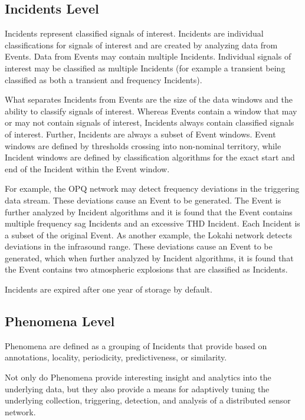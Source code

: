 \subsection{Incidents Level}\label{subsec:incidents-level}
Incidents represent classified signals of interest. Incidents are individual classifications for signals of interest and are created by analyzing data from Events. Data from Events may contain multiple Incidents. Individual signals of interest may be classified as multiple Incidents (for example a transient being classified as both a transient and frequency Incidents).

What separates Incidents from Events are the size of the data windows and the ability to classify signals of interest. Whereas Events contain a window that may or may not contain signals of interest, Incidents always contain classified signals of interest. Further, Incidents are always a subset of Event windows. Event windows are defined by thresholds crossing into non-nominal territory, while Incident windows are defined by classification algorithms for the exact start and end of the Incident within the Event window.

For example, the OPQ network may detect frequency deviations in the triggering data stream. These deviations cause an Event to be generated. The Event is further analyzed by Incident algorithms and it is found that the Event contains multiple frequency sag Incidents and an excessive THD Incident. Each Incident is a subset of the original Event. As another example, the Lokahi network detects deviations in the infrasound range. These deviations cause an Event to be generated, which when further analyzed by Incident algorithms, it is found that the Event contains two atmospheric explosions that are classified as Incidents.

Incidents are expired after one year of storage by default.

\subsection{Phenomena Level}\label{subsec:phenomena-level}
Phenomena are defined as a grouping of Incidents that provide based on annotations, locality, periodicity, predictiveness, or similarity.

Not only do Phenomena provide interesting insight and analytics into the underlying data, but they also provide a means for adaptively tuning the underlying collection, triggering, detection, and analysis of a distributed sensor network.

